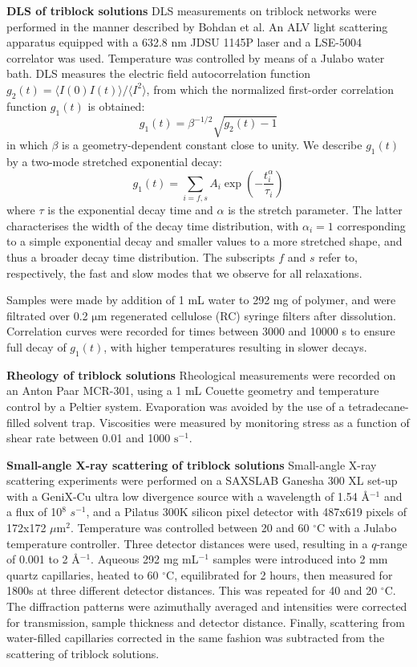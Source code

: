 \documentclass{article}
\begin{document}
\textbf{DLS of triblock solutions}
DLS measurements on triblock networks were performed in the manner described by
Bohdan et al.\cite{Bohdan2016} An ALV light scattering apparatus 
equipped with a 632.8 nm JDSU 1145P laser and a LSE-5004 correlator was used. Temperature was 
controlled by means of a Julabo water bath. DLS measures the electric field autocorrelation function 
$g_2(t) = {\langle I(0)I(t) \rangle}/{\langle I^2 \rangle}$, from which the normalized 
first-order correlation function $g_1(t)$ is obtained:
\begin{equation}
g_1(t) = \beta^{-1/2}\sqrt{g_2(t) - 1}
\end{equation}
in which $\beta$ is a geometry-dependent constant close to unity. We describe 
$g_1(t)$ by a two-mode stretched exponential decay:
\begin{equation} \label{eqn:bistrexp}
g_1(t) = \sum\limits_{i=f,s}A_i\exp(-\frac{t^\alpha_i}{\tau_i})
\end{equation}
where $\tau$ is the exponential decay time and $\alpha$ is the stretch parameter. The latter
characterises the width of the decay time distribution, with $\alpha_i=1$ corresponding to
a simple exponential decay and smaller values to a more stretched shape, and thus a broader
decay time distribution. The subscripts $f$ and $s$ refer to, respectively, the fast and
slow modes that we observe for all relaxations.\cite{Thuresson1999} 

Samples were made by addition of 1 mL water to 292 mg of polymer, and were filtrated over 
0.2 $\mathrm{\mu m}$ regenerated cellulose (RC) syringe filters after dissolution. 
Correlation curves were recorded for times between 3000 and 10000 s to ensure full 
decay of $g_1(t)$, with higher temperatures resulting in slower decays.

\textbf{Rheology of triblock solutions}
Rheological measurements were recorded on an Anton Paar MCR-301, using a 1 mL Couette geometry and temperature
control by a Peltier system. Evaporation was avoided by the use of a tetradecane-filled solvent trap. Viscosities
were measured by monitoring stress as a function of shear rate between 0.01 and 1000 $\mathrm{s}^{-1}$.

\textbf{Small-angle X-ray scattering of triblock solutions}
Small-angle X-ray scattering experiments were performed on a SAXSLAB Ganesha 300 XL set-up with a 
GeniX-Cu ultra low divergence source with a wavelength of 1.54 \AA$^{-1}$ and a flux of 
10$^8$ $s^{-1}$,
and a Pilatus 300K silicon pixel detector with 487x619 pixels of 172x172 $\mu \mathrm{m}^
2$. Temperature was controlled
between 20 and 60 $^\circ\mathrm{C}$ with a Julabo temperature controller. Three 
detector distances were used,
resulting in a $q$-range of 0.001 to 2 \AA$^{-1}$. Aqueous 292 mg mL$^{-1}$ 
samples were introduced into 
2 mm quartz capillaries, heated to 60 $^\circ\mathrm{C}$, equilibrated for 2 hours, then 
measured for 1800s at three different detector
distances. This was repeated for 40 and 20 $^\circ\mathrm{C}$. The diffraction patterns 
were azimuthally averaged
and intensities were corrected for transmission, sample thickness and detector distance. 
Finally, scattering from water-filled capillaries corrected in the same fashion was
subtracted from the scattering of triblock solutions.
\end{document}
